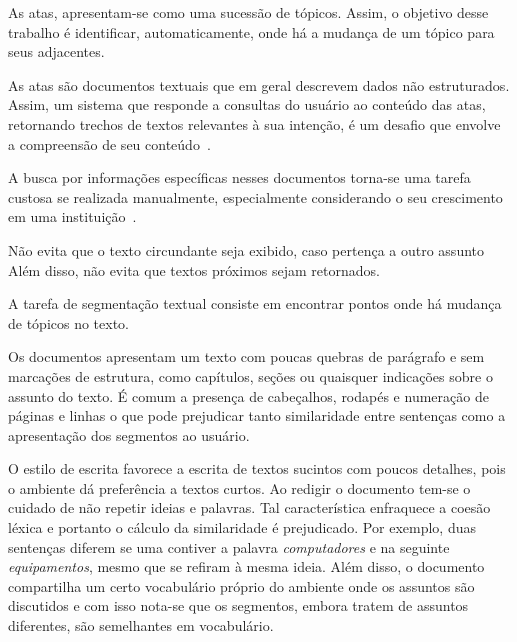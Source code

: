 
As atas, apresentam-se como uma sucessão de tópicos. Assim, o objetivo desse trabalho é identificar, automaticamente, onde há a mudança de um tópico para seus adjacentes.




As atas são documentos textuais que em geral descrevem dados não estruturados. Assim, um sistema que responde a consultas do usuário ao conteúdo das atas, retornando trechos de textos relevantes à sua intenção, é um desafio que envolve a compreensão de seu conteúdo~\cite{Bokaei2015}. 



A busca por informações específicas nesses documentos torna-se uma tarefa custosa se realizada manualmente, especialmente considerando o seu crescimento em uma instituição~\cite{Lee2011, Masakazu2013, Miriam2013}.





Não evita que o texto circundante seja exibido, caso pertença a outro assunto
Além disso, não evita que textos próximos sejam retornados.

A tarefa de segmentação textual consiste em encontrar pontos onde há mudança de tópicos no texto.  %



 Os documentos apresentam um texto com poucas quebras de parágrafo e sem marcações de estrutura, como capítulos, seções ou quaisquer indicações sobre o assunto do texto. É comum a presença de cabeçalhos, rodapés e numeração de páginas e linhas o que pode prejudicar tanto similaridade entre sentenças como a apresentação dos segmentos ao usuário. %



O estilo de escrita favorece a escrita de textos sucintos com poucos detalhes, pois o ambiente dá preferência a textos curtos. Ao redigir o documento tem-se o cuidado de não repetir ideias e palavras. Tal característica enfraquece a coesão léxica e portanto o cálculo da similaridade é prejudicado. Por exemplo, duas sentenças diferem se uma contiver a palavra \textit{computadores} e na seguinte \textit{equipamentos}, mesmo que se refiram à mesma ideia. Além disso, o documento compartilha um certo vocabulário próprio do ambiente onde os assuntos são discutidos e com isso nota-se que os segmentos, embora tratem de assuntos diferentes, são semelhantes em vocabulário.


